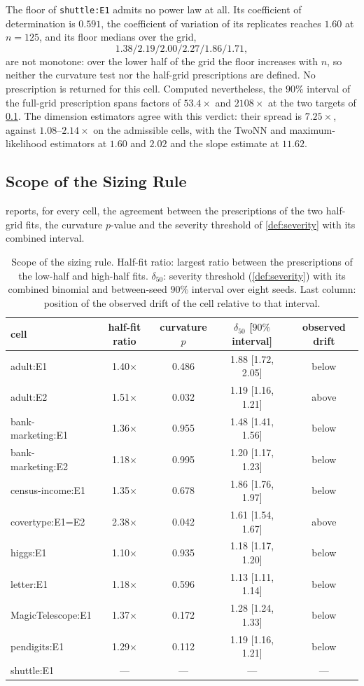 \documentclass[twoside,11pt]{article}
\theoremstyle{plain}
\theoremstyle{definition}
\theoremstyle{remark}
\begin{document}
The floor of \texttt{shuttle:E1} admits no power law at all. Its coefficient
of determination is $0.591$, the coefficient of variation of its
replicates reaches $1.60$ at $n = 125$, and its floor medians over
the grid,
\[
  1.38/2.19/2.00/2.27/1.86/1.71,
\]
are not monotone: over the lower half of the grid the floor increases with
$n$, so neither the curvature test nor the half-grid prescriptions are
defined. No prescription is returned for this cell. Computed nevertheless,
the $90\%$ interval of the full-grid prescription spans factors of
$53.4\times$ and $2108\times$ at the two targets of
\cref{sec:empirical-scope}. The dimension estimators agree with this
verdict: their spread is $7.25\times$, against
$1.08$--$2.14\times$ on the admissible cells, with the TwoNN and
maximum-likelihood estimators at $1.60$ and $2.02$ and the slope estimate at
$11.62$.

\subsection{Scope of the Sizing Rule}\label{sec:empirical-scope}

 reports, for every cell, the agreement between the
prescriptions of the two half-grid fits, the curvature $p$-value and the
severity threshold of \cref{def:severity} with its combined interval.

\begin{table}[htbp]
\centering
\small
\begin{tabular}{lcccc}
\toprule
cell & half-fit ratio & curvature $p$ &
$\delta_{50}$ [$90\%$ interval] & observed drift \\
\midrule
adult:E1 & 1.40$\times$ & 0.486 & 1.88 [1.72, 2.05] & below \\
adult:E2 & 1.51$\times$ & 0.032 & 1.19 [1.16, 1.21] & above \\
bank-marketing:E1 & 1.36$\times$ & 0.955 & 1.48 [1.41, 1.56] & below \\
bank-marketing:E2 & 1.18$\times$ & 0.995 & 1.20 [1.17, 1.23] & below \\
census-income:E1 & 1.35$\times$ & 0.678 & 1.86 [1.76, 1.97] & below \\
covertype:E1=E2 & 2.38$\times$ & 0.042 & 1.61 [1.54, 1.67] & above \\
higgs:E1 & 1.10$\times$ & 0.935 & 1.18 [1.17, 1.20] & below \\
letter:E1 & 1.18$\times$ & 0.596 & 1.13 [1.11, 1.14] & below \\
MagicTelescope:E1 & 1.37$\times$ & 0.172 & 1.28 [1.24, 1.33] & below \\
pendigits:E1 & 1.29$\times$ & 0.112 & 1.19 [1.16, 1.21] & below \\
shuttle:E1 & --- & --- & --- & --- \\
\bottomrule
\end{tabular}
\caption{Scope of the sizing rule. Half-fit ratio: largest ratio between the
prescriptions of the low-half and high-half fits. $\delta_{50}$: severity
threshold (\cref{def:severity}) with its combined binomial and between-seed
$90\%$ interval over eight seeds. Last column: position of the observed
drift of the cell relative to that interval.}\label{tab:scope}
\end{table}
\end{document}
